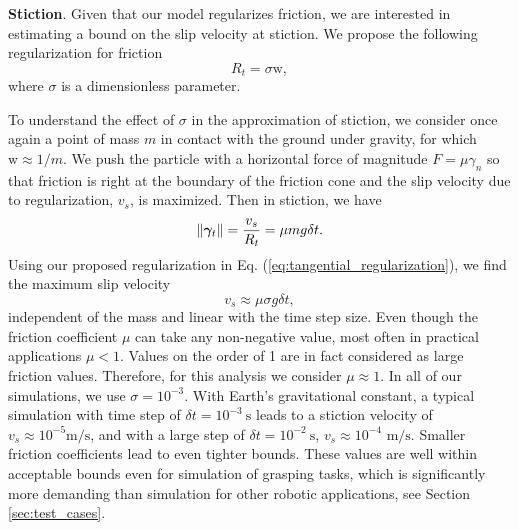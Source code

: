 \textbf{Stiction}. Given that our model regularizes friction, we are interested
in estimating a bound on the slip velocity at stiction. We propose the following
regularization for friction
\begin{equation}
    R_t = \sigma \text{w},
    \label{eq:tangential_regularization}
\end{equation}
where $\sigma$ is a dimensionless parameter.

To understand the effect of $\sigma$ in the approximation of stiction, we
consider once again a point of mass $m$ in contact with the ground under
gravity, for which $\text{w}\approx 1/m$. We push the particle with a horizontal
force of magnitude $F=\mu\gamma_n$ so that friction is right at the boundary of
the friction cone and the slip velocity due to regularization, $v_s$, is
maximized. Then in stiction, we have
\begin{equation*}
    \|{\bm\gamma}_t\| = \frac{v_s}{R_t} = \mu m g \delta t.
\end{equation*}
Using our proposed regularization in Eq. (\ref{eq:tangential_regularization}),
we find the maximum slip velocity
\begin{equation}
    v_s \approx \mu\sigma g \delta t,
    \label{eq:slip_estimation}
\end{equation}
independent of the mass and linear with the time step size. Even though the
friction coefficient $\mu$ can take any non-negative value, most often in
practical applications $\mu < 1$. Values on the order of 1 are in fact
considered as large friction values. Therefore, for this analysis we consider
$\mu\approx 1$. In all of our simulations, we use $\sigma=10^{-3}$. With Earth's
gravitational constant, a typical simulation with time step of $\delta
t=10^{-3}~\text{s}$ leads to a stiction velocity of $v_s\approx
10^{-5}\text{m}/\text{s}$, and with a large step of $\delta t=10^{-2}~\text{s}$,
$v_s\approx 10^{-4}\text{ m}/\text{s}$. Smaller friction coefficients lead to
even tighter bounds. These values are well within acceptable bounds even for
simulation of grasping tasks, which is significantly more demanding than
simulation for other robotic applications, see Section \ref{sec:test_cases}.

